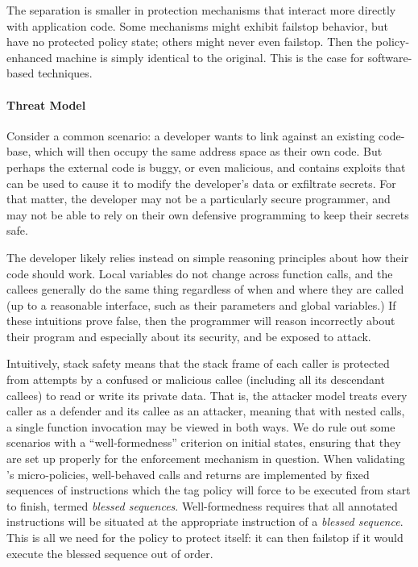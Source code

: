 \documentclass[acmsmall,review,anonymous]{acmart}\settopmatter{printfolios=true,printccs=false,printacmref=false}
\begin{document}
The separation is smaller in protection mechanisms that interact more directly
with application code. Some mechanisms might exhibit failstop behavior, but have
no protected policy state; others might never even failstop. Then the policy-enhanced
machine is simply identical to the original. This is the case for software-based
techniques.

\paragraph*{Threat Model}
\label{sec:threat}

Consider a common scenario: a developer wants to link against an existing
code-base, which will then occupy the same address space as their own code.
But perhaps the external code is buggy, or even malicious, and contains
exploits that can be used to cause it to modify the developer's data or
exfiltrate secrets. For that matter, the developer may not be a particularly
secure programmer, and may not be able to rely on their own defensive programming
to keep their secrets safe.

The developer likely relies instead on simple reasoning principles about how
their code should work. Local variables do not change across function calls,
and the callees generally do the same thing regardless of when and where they
are called (up to a reasonable interface, such as their parameters and global
variables.) If these intuitions prove false, then the programmer will reason
incorrectly about their program and especially about its security, and
be exposed to attack.

Intuitively, stack safety means that the stack frame of each caller is protected
from attempts by a confused or malicious callee (including all its
descendant callees) to read or write its private data.
That is, the attacker model treats every caller as a defender and its callee as
an attacker, meaning that with nested calls, a single function invocation
may be viewed in both ways. We do rule out some
scenarios with a ``well-formedness'' criterion on initial states, ensuring that
they are set up properly for the enforcement mechanism in question.
When validating \citeauthor{DBLP:conf/sp/RoesslerD18}'s micro-policies,
well-behaved calls and returns are implemented by fixed sequences of instructions
which the tag policy will force to be executed from start to finish,
termed {\em blessed sequences}. Well-formedness requires that all annotated
instructions will be situated at the appropriate instruction of a {\em blessed sequence}.
This is all we need for the policy to protect itself: it can then failstop if it would
execute the blessed sequence out of order.
\end{document}
